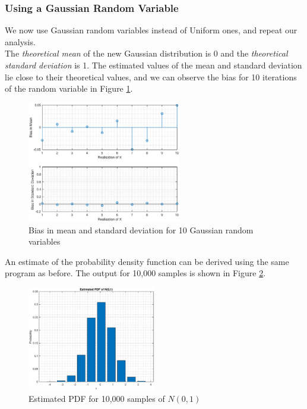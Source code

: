 \subsubsection{Using a Gaussian Random Variable}

We now use Gaussian random variables instead of Uniform ones, and repeat our analysis.\\

The \textit{theoretical mean} of the new Gaussian distribution is 0 and the \textit{theoretical standard deviation} is 1. The estimated values of the mean and standard deviation lie close to their theoretical values, and we can observe the bias for 10 iterations of the random variable in Figure \ref{fig:bias_gaussian}.\\

\begin{figure}[h!]
\centering
\includegraphics[width=0.6\textwidth]{bias_gaussian}
\caption{\label{fig:bias_gaussian} Bias in mean and standard deviation for 10 Gaussian random variables}
\end{figure}

An estimate of the probability density function can be derived using the same program as before. The output for 10,000 samples is shown in Figure \ref{fig:pdf_gaussian}.

\begin{figure}[h!]
\centering
\includegraphics[width=0.5\textwidth]{pdf_gaussian}
\caption{\label{fig:pdf_gaussian} Estimated PDF for 10,000 samples of $N(0,1)$}
\end{figure}


